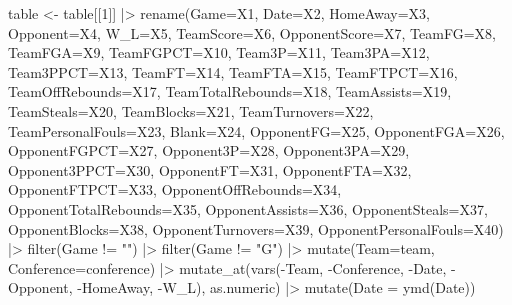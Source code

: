 \documentclass[
  letterpaper,
  DIV=11,
  numbers=noendperiod]{scrreprt}
\newenvironment{Shaded}{\begin{snugshade}}{\end{snugshade}}
\newcommand{\AttributeTok}[1]{\textcolor[rgb]{0.40,0.45,0.13}{#1}}
\newcommand{\DecValTok}[1]{\textcolor[rgb]{0.68,0.00,0.00}{#1}}
\newcommand{\FunctionTok}[1]{\textcolor[rgb]{0.28,0.35,0.67}{#1}}
\newcommand{\NormalTok}[1]{\textcolor[rgb]{0.00,0.23,0.31}{#1}}
\newcommand{\OtherTok}[1]{\textcolor[rgb]{0.00,0.23,0.31}{#1}}
\newcommand{\SpecialCharTok}[1]{\textcolor[rgb]{0.37,0.37,0.37}{#1}}
\newcommand{\StringTok}[1]{\textcolor[rgb]{0.13,0.47,0.30}{#1}}
\begin{document}
\begin{Shaded}
\begin{Highlighting}[]
\NormalTok{table }\OtherTok{\textless{}{-}}\NormalTok{ table[[}\DecValTok{1}\NormalTok{]] }\SpecialCharTok{|\textgreater{}} \FunctionTok{rename}\NormalTok{(}\AttributeTok{Game=}\NormalTok{X1, }\AttributeTok{Date=}\NormalTok{X2, }\AttributeTok{HomeAway=}\NormalTok{X3, }\AttributeTok{Opponent=}\NormalTok{X4, }\AttributeTok{W\_L=}\NormalTok{X5, }\AttributeTok{TeamScore=}\NormalTok{X6, }\AttributeTok{OpponentScore=}\NormalTok{X7, }\AttributeTok{TeamFG=}\NormalTok{X8, }\AttributeTok{TeamFGA=}\NormalTok{X9, }\AttributeTok{TeamFGPCT=}\NormalTok{X10, }\AttributeTok{Team3P=}\NormalTok{X11, }\AttributeTok{Team3PA=}\NormalTok{X12, }\AttributeTok{Team3PPCT=}\NormalTok{X13, }\AttributeTok{TeamFT=}\NormalTok{X14, }\AttributeTok{TeamFTA=}\NormalTok{X15, }\AttributeTok{TeamFTPCT=}\NormalTok{X16, }\AttributeTok{TeamOffRebounds=}\NormalTok{X17, }\AttributeTok{TeamTotalRebounds=}\NormalTok{X18, }\AttributeTok{TeamAssists=}\NormalTok{X19, }\AttributeTok{TeamSteals=}\NormalTok{X20, }\AttributeTok{TeamBlocks=}\NormalTok{X21, }\AttributeTok{TeamTurnovers=}\NormalTok{X22, }\AttributeTok{TeamPersonalFouls=}\NormalTok{X23, }\AttributeTok{Blank=}\NormalTok{X24, }\AttributeTok{OpponentFG=}\NormalTok{X25, }\AttributeTok{OpponentFGA=}\NormalTok{X26, }\AttributeTok{OpponentFGPCT=}\NormalTok{X27, }\AttributeTok{Opponent3P=}\NormalTok{X28, }\AttributeTok{Opponent3PA=}\NormalTok{X29, }\AttributeTok{Opponent3PPCT=}\NormalTok{X30, }\AttributeTok{OpponentFT=}\NormalTok{X31, }\AttributeTok{OpponentFTA=}\NormalTok{X32, }\AttributeTok{OpponentFTPCT=}\NormalTok{X33, }\AttributeTok{OpponentOffRebounds=}\NormalTok{X34, }\AttributeTok{OpponentTotalRebounds=}\NormalTok{X35, }\AttributeTok{OpponentAssists=}\NormalTok{X36, }\AttributeTok{OpponentSteals=}\NormalTok{X37, }\AttributeTok{OpponentBlocks=}\NormalTok{X38, }\AttributeTok{OpponentTurnovers=}\NormalTok{X39, }\AttributeTok{OpponentPersonalFouls=}\NormalTok{X40) }\SpecialCharTok{|\textgreater{}} \FunctionTok{filter}\NormalTok{(Game }\SpecialCharTok{!=} \StringTok{""}\NormalTok{) }\SpecialCharTok{|\textgreater{}} \FunctionTok{filter}\NormalTok{(Game }\SpecialCharTok{!=} \StringTok{"G"}\NormalTok{) }\SpecialCharTok{|\textgreater{}} \FunctionTok{mutate}\NormalTok{(}\AttributeTok{Team=}\NormalTok{team, }\AttributeTok{Conference=}\NormalTok{conference) }\SpecialCharTok{|\textgreater{}} \FunctionTok{mutate\_at}\NormalTok{(}\FunctionTok{vars}\NormalTok{(}\SpecialCharTok{{-}}\NormalTok{Team, }\SpecialCharTok{{-}}\NormalTok{Conference, }\SpecialCharTok{{-}}\NormalTok{Date, }\SpecialCharTok{{-}}\NormalTok{Opponent, }\SpecialCharTok{{-}}\NormalTok{HomeAway, }\SpecialCharTok{{-}}\NormalTok{W\_L), as.numeric) }\SpecialCharTok{|\textgreater{}} \FunctionTok{mutate}\NormalTok{(}\AttributeTok{Date =} \FunctionTok{ymd}\NormalTok{(Date)) }
\end{Highlighting}
\end{Shaded}
\end{document}
